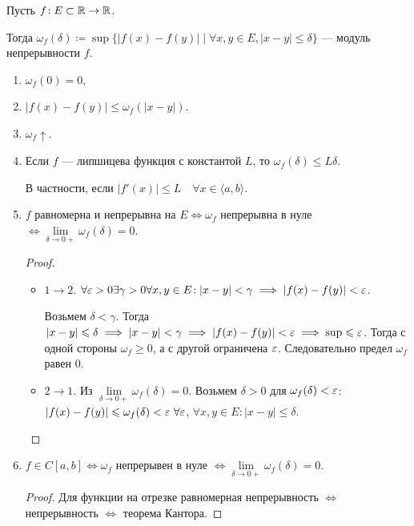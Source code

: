 \begin{definition}
    Пусть $f\!: E \subset \mathbb{R} \to \mathbb{R}$.

    Тогда $\omega_f(\delta) \coloneqq \sup \{|f(x) - f(y)|\mid \forall x, y \in E, |x-y| \le \delta\}$ --- модуль непрерывности $f$.
\end{definition}
\begin{properties}
    \begin{enumerate}
        \item $\omega_f(0) = 0$,
        \item $|f(x) - f(y)| \le \omega_f(|x-y|)$.
        \item $\omega_f \uparrow$.
        \item Если  $f$ --- липшицева функция с константой $L$, то  $\omega_f(\delta) \le L \delta$.

            В частности, если $|f'(x)| \le L\quad \forall x \in \langle a, b \rangle$.
        \item $f$ равномерна и непрерывна на $E \iff \omega_f$ непрерывна в нуле  $\iff \lim\limits_{\delta \to 0+} \omega_f(\delta) = 0$.
            \begin{proof}
                 \begin{itemize}
                     \item $1 \to 2$.  $\forall \varepsilon > 0 \exists \gamma > 0 \forall x, y \in E\!: |x-y| < \gamma \implies |f(x) - f(y)| < \varepsilon$. 

                         Возьмем  $\delta < \gamma$. Тогда $|x-y| \leqslant \delta \implies |x-y| < \gamma \implies |f(x) - f(y)| < \varepsilon \implies \sup \leqslant \varepsilon$. Тогда с одной стороны $\omega_f \ge 0$, а с другой ограничена $\varepsilon$. Следовательно предел $\omega_f$ равен  $0$.
                     \item $2 \to 1$. Из $\lim\limits_{\delta \to 0+} \omega_f(\delta) = 0$. Возьмем  $\delta > 0$ для $\omega_f(\delta) < \varepsilon$:  $|f(x) - f(y)| \le \omega_f(\delta) < \eps\ \forall \eps$, $\forall x, y \in E\!: |x-y| \le \delta$.
                \end{itemize}
            \end{proof}
        \item $f \in C[a, b] \iff \omega_f$ непрерывен в нуле $\iff \lim\limits_{\delta \to 0+} \omega_f(\delta)= 0$. 
             \begin{proof}
                 Для функции на отрезке равномерная непрерывность $\iff $ непрерывность $\iff$ теорема Кантора.
             \end{proof}
    \end{enumerate}
\end{properties}
